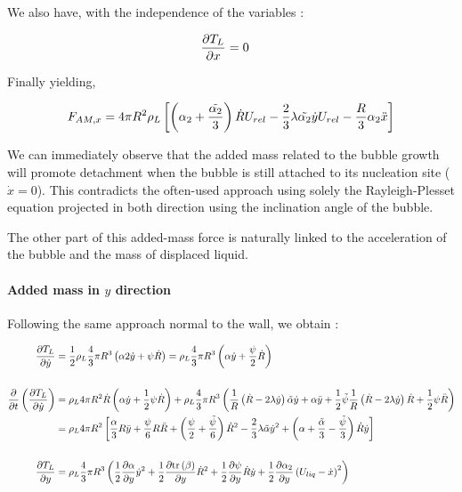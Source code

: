 We also have, with the independence of the variables :

\begin{align}
\frac{\partial T_{L}}{\partial x}&=0
\end{align}


Finally yielding, 

\begin{align}
F_{AM,x}=4\pi R^{2}\rho_{L} \left[ \left( \alpha_{2}+\frac{\tilde{\alpha_{2}}}{3} \right)\dot{R}U_{rel}-\frac{2}{3}\lambda \tilde{\alpha_{2}}\dot{y}U_{rel}-\frac{R}{3}\alpha_{2}\ddot{x}  \right]
\end{align}

We can immediately observe that the added mass related to the bubble growth will promote detachment when the bubble is still attached to its nucleation site ($\dot{x}=0$). This contradicts the often-used approach using solely the Rayleigh-Plesset equation projected in both direction using the inclination angle of the bubble. 

The other part of this added-mass force is naturally linked to the acceleration of the bubble and the mass of displaced liquid. 


\paragraph{Added mass in $y$ direction}

Following the same approach normal to the wall, we obtain : 

\begin{align}
\frac{\partial T_{L}}{\partial \dot{y}}&=\frac{1}{2}\rho_{L}\frac{4}{3}\pi R^{3}\left( \alpha 2\dot{y}+\psi\dot{R} \right)=\rho_{L}\frac{4}{3}\pi R^{3}\left( \alpha \dot{y} + \frac{\psi}{2}\dot{R} \right)\\
\nonumber \\
\frac{\partial }{\partial t}\left( \frac{\partial T_{L}}{\partial \dot{y}} \right)&=\rho_{L}4\pi R^{2}\dot{R}\left( \alpha \dot{y} + \frac{1}{2} \psi \dot{R} \right)+\rho_{L}\frac{4}{3}\pi R^{3}\left( \frac{1}{R}\left( \dot{R}-2\lambda \dot{y} \right)\tilde{\alpha}\dot{y} +\alpha\ddot{y}+\frac{1}{2}\tilde{\psi}\frac{1}{R}\left( \dot{R}-2\lambda \dot{y} \right)\dot{R} +\frac{1}{2}\psi \ddot{R} \right)\\
&=\rho_{L}4\pi R^{2}\left[ \frac{\alpha}{3}R\ddot{y}+\frac{\psi}{6}R \ddot{R} + \left( \frac{\psi}{2} +\frac{\tilde{\psi}}{6} \right)\dot{R}^{2} -\frac{2}{3}\lambda \tilde{\alpha} \dot{y}^{2} + \left(  \alpha + \frac{\tilde{\alpha}}{3} - \frac{\tilde{\psi}}{3}  \right)\dot{R}\dot{y}  \right]\\
\nonumber \\
\frac{\partial T_{L}}{\partial y}&=\rho_{L}\frac{4}{3}\pi R^{3} \left(  \frac{1}{2} \frac{\partial \alpha}{\partial y}\dot{y}^{2} + \frac{1}{2} \frac{\partial \mathrm{tr}\left( \beta \right)}{\partial y}\dot{R}^{2}+\frac{1}{2}\frac{\partial \psi}{\partial y}\dot{R}\dot{y}+\frac{1}{2}\frac{\partial \alpha_{2}}{\partial y}\left( U_{liq}-\dot{x} \right)^{2}  \right) 
\end{align}


